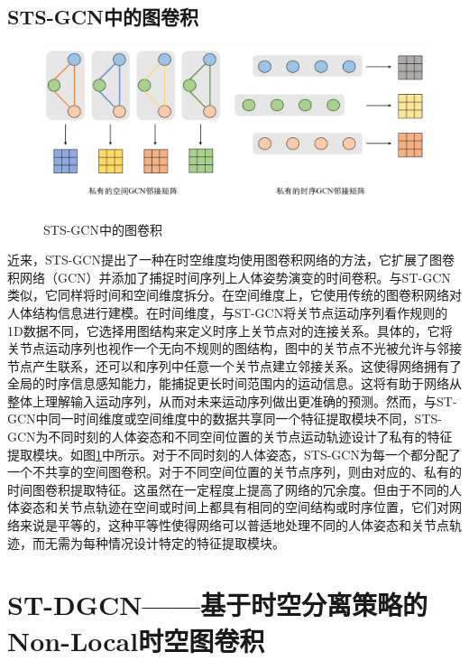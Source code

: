 \subsection{STS-GCN中的图卷积}
\begin{figure}[ht]
    \centering
    \includegraphics[width=1\textwidth]{FigMa/STS-GCN.png}\\
    \vspace{-0.3cm}
    \caption{STS-GCN中的图卷积}
    \label{fig:STS-GCN_structure}
\end{figure}

近来，STS-GCN\parencite{sofianos2021space}提出了一种在时空维度均使用图卷积网络的方法，它扩展了图卷积网络（GCN）并添加了捕捉时间序列上人体姿势演变的时间卷积。与ST-GCN类似，它同样将时间和空间维度拆分。在空间维度上，它使用传统的图卷积网络对人体结构信息进行建模。在时间维度，与ST-GCN将关节点运动序列看作规则的1D数据不同，它选择用图结构来定义时序上关节点对的连接关系。具体的，它将关节点运动序列也视作一个无向不规则的图结构，图中的关节点不光被允许与邻接节点产生联系，还可以和序列中任意一个关节点建立邻接关系。这使得网络拥有了全局的时序信息感知能力，能捕捉更长时间范围内的运动信息。这将有助于网络从整体上理解输入运动序列，从而对未来运动序列做出更准确的预测。然而，与ST-GCN中同一时间维度或空间维度中的数据共享同一个特征提取模块不同，STS-GCN为不同时刻的人体姿态和不同空间位置的关节点运动轨迹设计了私有的特征提取模块。如图\ref{fig:STS-GCN_structure}中所示。对于不同时刻的人体姿态，STS-GCN为每一个都分配了一个不共享的空间图卷积。对于不同空间位置的关节点序列，则由对应的、私有的时间图卷积提取特征。这虽然在一定程度上提高了网络的冗余度。但由于不同的人体姿态和关节点轨迹在空间或时间上都具有相同的空间结构或时序位置，它们对网络来说是平等的，这种平等性使得网络可以普适地处理不同的人体姿态和关节点轨迹，而无需为每种情况设计特定的特征提取模块。

\section{ST-DGCN——基于时空分离策略的Non-Local时空图卷积}
